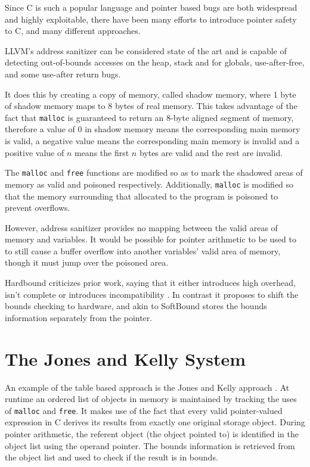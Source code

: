 Since C is such a popular language and pointer based bugs are both widespread and highly exploitable, there have been many efforts to introduce pointer safety to C, and many different approaches.

LLVM's address sanitizer \cite{llvmAddrSan, llvmAddrSanAlgo} can be considered state of the art and  is capable of detecting out-of-bounds accesses on the heap, stack and for globals, use-after-free, and some use-after return bugs.

It does this by creating a copy of memory, called shadow memory, where 1 byte of shadow memory maps to 8 bytes of real memory.
This takes advantage of the fact that \verb!malloc! is guaranteed to return an 8-byte aligned segment of memory, therefore a value of 0 in shadow memory means the corresponding main memory is valid, a negative value means the corresponding main memory is invalid and a positive value of $n$ means the first $n$ bytes are valid and the rest are invalid.

The \verb!malloc! and \verb!free! functions are modified so as to mark the shadowed areas of memory as valid and poisoned respectively.
Additionally, \verb!malloc! is modified so that the memory surrounding that allocated to the program is poisoned to prevent overflows.

However, address sanitizer provides no mapping between the valid areas of memory and variables.
It would be possible for pointer arithmetic to be used to to still cause a buffer overflow into another variables' valid area of memory, though it must jump over the poisoned area.

Hardbound criticizes prior work, saying that it either introduces high overhead, isn't complete or introduces incompatibility \cite{devietti2008hardbound}.
In contrast it proposes to shift the bounds checking to hardware, and akin to SoftBound stores the bounds information separately from the pointer.

\section{The Jones and Kelly System}

An example of the table based approach is the Jones and Kelly approach \cite{jones1997backwards}.
At runtime an ordered list of objects in memory is maintained by tracking the uses of \verb!malloc! and \verb!free!.
It makes use of the fact that every valid pointer-valued expression in C derives its results from exactly one original storage object.
During pointer arithmetic, the referent object (the object pointed to) is identified in the object list using the operand pointer.
The bounds information is retrieved from the object list and used to check if the result is in bounds.

